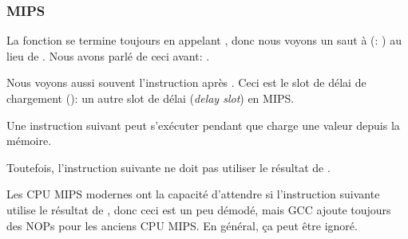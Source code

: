 \subsubsection{MIPS}




La fonction se termine toujours en appelant \puts, donc nous voyons un saut à \puts
(: ) au lieu de .
Nous avons parlé de ceci avant: .

Nous voyons aussi souvent l'instruction  après .
Ceci est le slot de délai de chargement (): un autre slot de
délai (\emph{delay slot}) en MIPS.

Une instruction suivant  peut s'exécuter pendant que  charge une
valeur depuis la mémoire.

Toutefois, l'instruction suivante ne doit pas utiliser le résultat de .

Les CPU MIPS modernes ont la capacité d'attendre si l'instruction suivante utilise
le résultat de , donc ceci est un peu démodé, mais GCC ajoute toujours
des NOPs pour les anciens CPU MIPS.
En général, ça peut être ignoré.

